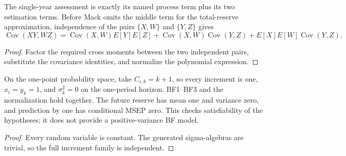 \begin{theorem}\label{thm:bfTotalCovariance}\leanok
{}
The single-year assessment is exactly its named process term plus its two
estimation terms. Before Mack omits the middle term for the total-reserve
approximation, independence of the pairs $\{X,W\}$ and $\{Y,Z\}$ gives
\[
 \operatorname{Cov}(XY,WZ)
 =\operatorname{Cov}(X,W)E[Y]E[Z]
  +\operatorname{Cov}(X,W)\operatorname{Cov}(Y,Z)
  +E[X]E[W]\operatorname{Cov}(Y,Z).
\]
\end{theorem}
\begin{proof}\leanok Factor the required cross moments between the two
independent pairs, substitute the covariance identities, and normalize the
polynomial expression. \end{proof}

\begin{theorem}\label{thm:bfWitness}\leanok
{}
On the one-point probability space, take $C_{i,k}=k+1$, so every increment is
one, $x_i=y_k=1$, and $\sigma_k^2=0$ on the one-period horizon. BF1--BF3 and
the normalization hold together. The future reserve has mean one and variance
zero, and prediction by one has conditional MSEP zero. This checks
satisfiability of the hypotheses; it does not provide a positive-variance BF
model.
\end{theorem}
\begin{proof}\leanok Every random variable is constant. The generated
sigma-algebras are trivial, so the full increment family is independent. \end{proof}
